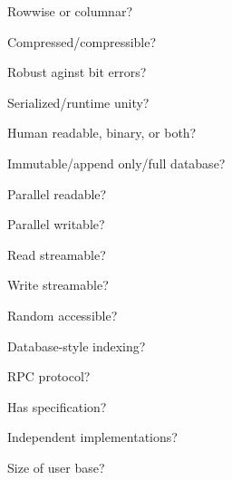 \documentclass[aspectratio=169]{beamer}
\begin{document}
\begin{frame}{Rowwise or columnar?}
\vspace{0.5 cm}
\end{frame}

\begin{frame}{Compressed/compressible?}
\vspace{0.5 cm}
\end{frame}

\begin{frame}{Robust aginst bit errors?}
\vspace{0.5 cm}
\end{frame}

\begin{frame}{Serialized/runtime unity?}
\vspace{0.5 cm}
\end{frame}

\begin{frame}{Human readable, binary, or both?}
\vspace{0.5 cm}
\end{frame}

\begin{frame}{Immutable/append only/full database?}
\vspace{0.5 cm}
\end{frame}

\begin{frame}{Parallel readable?}
\vspace{0.5 cm}
\end{frame}

\begin{frame}{Parallel writable?}
\vspace{0.5 cm}
\end{frame}

\begin{frame}{Read streamable?}
\vspace{0.5 cm}
\end{frame}

\begin{frame}{Write streamable?}
\vspace{0.5 cm}
\end{frame}

\begin{frame}{Random accessible?}
\vspace{0.5 cm}
\end{frame}

\begin{frame}{Database-style indexing?}
\vspace{0.5 cm}
\end{frame}

\begin{frame}{RPC protocol?}
\vspace{0.5 cm}
\end{frame}

\begin{frame}{Has specification?}
\vspace{0.5 cm}
\end{frame}

\begin{frame}{Independent implementations?}
\vspace{0.5 cm}
\end{frame}

\begin{frame}{Size of user base?}
\vspace{0.5 cm}
\end{frame}
\end{document}
